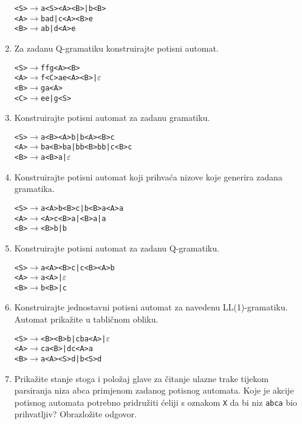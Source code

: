 \documentclass[times, 12pt, utf8]{book}
\begin{document}
\begin{enumerate}[resume]
\begin{alltt}
<S> \(\to\) a<S><A><B> | b<B>
<A> \(\to\) bad | c<A><B>e
<B> \(\to\) ab | d<A>e
\end{alltt} 

\item
Za zadanu Q-gramatiku konstruirajte potisni automat. \cite[str.~94-95]{udzbenik} \cite{auditorne}

\begin{alltt}
<S> \(\to\) ffg<A><B>
<A> \(\to\) f<C>ae<A><B> | \(\varepsilon\)
<B> \(\to\) ga<A>
<C> \(\to\) ee | g<S>
\end{alltt}

\item
Konstruirajte potisni automat za zadanu gramatiku. \cite[str.~94-95]{udzbenik}

\begin{alltt}
<S> \(\to\) a<B><A>b | b<A><B>c
<A> \(\to\) ba<B>ba | bb<B>bb | c<B>c
<B> \(\to\) a<B>a | \(\varepsilon\)
\end{alltt} 

\item
Konstruirajte potisni automat koji prihvaća nizove koje generira zadana gramatika. \cite[str.~98-99]{udzbenik}

\begin{alltt}
<S> \(\to\) a<A>b<B>c | b<B>a<A>a
<A> \(\to\) <A>c<B>a | <B>a | a
<B> \(\to\) <B>b | b
\end{alltt} 

\item
Konstruirajte potisni automat za zadanu Q-gramatiku. \cite[str.~94-95]{udzbenik} \cite{auditorne}

\begin{alltt}
<S> \(\to\) a<A><B>c | c<B><A>b
<A> \(\to\) a<A> | \(\varepsilon\)
<B> \(\to\) b<B> | c
\end{alltt} 

\item
Konstruirajte jednostavni potisni automat za navedenu LL(1)-gramatiku.
Automat prikažite u tabličnom obliku. \cite[str.~99]{udzbenik}

\begin{alltt}
<S> \(\to\) <B><B>b | cba<A> | \(\varepsilon\)
<A> \(\to\) ca<B> | dc<A>a
<B> \(\to\) a<A><S>d | b<S>d
\end{alltt} 

\item
Prikažite stanje stoga i položaj glave za čitanje ulazne trake tijekom parsiranja niza abca primjenom zadanog potisnog automata.
Koje je akcije potisnog automata potrebno pridružiti ćeliji s oznakom \texttt{X} da bi niz \texttt{abca} bio prihvatljiv? 
Obrazložite odgovor. \cite[str.~90]{udzbenik}


\end{enumerate}
\end{document}
